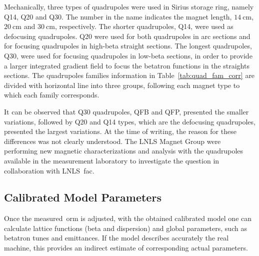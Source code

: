 Mechanically, three types of quadrupoles were used in Sirius storage ring, namely Q14, Q20 and Q30. The number in the name indicates the magnet length, $\SI{14}{\cm}$, $\SI{20}{\cm}$ and $\SI{30}{\cm}$, respectively. The shorter quadrupoles, Q14, were used as defocusing quadrupoles. Q20 were used for both quadrupoles in arc sections and for focusing quadrupoles in high-beta straight sections. The longest quadrupoles, Q30, were used for focusing quadrupoles in low-beta sections, in order to provide a larger integrated gradient field to focus the betatron functions in the straights sections. The quadrupoles families information in Table~\ref{tab:quad_fam_corr} are divided with horizontal line into three groups, following each magnet type to which each family corresponds. 

It can be observed that Q30 quadrupoles, QFB and QFP, presented the smaller variations, followed by Q20 and Q14 types, which are the defocusing quadrupoles, presented the largest variations. At the time of writing, the reason for these differences was not clearly understood. The LNLS Magnet Group were performing new magnetic characterizations and analysis with the quadrupoles available in the measurement laboratory to investigate the question in collaboration with LNLS~\gls{fac}.

\subsection{Calibrated Model Parameters}
Once the measured~\gls{orm} is adjusted, with the obtained calibrated model one can calculate lattice functions (beta and dispersion) and global parameters, such as betatron tunes and emittances. If the model describes accurately the real machine, this provides an indirect estimate of corresponding actual parameters.

